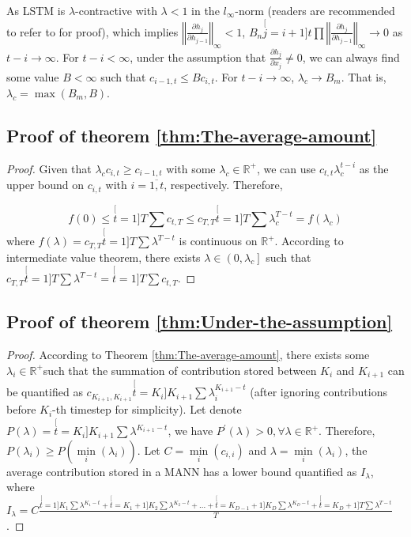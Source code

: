 As LSTM is $\lambda$-contractive with $\lambda<1$ in the $l_{\infty}$-norm
(readers are recommended to refer to \cite{miller2018recurrent} for
proof), which implies $\left\Vert \frac{\partial h_{j}}{\partial h_{j-1}}\right\Vert _{\infty}<1$,
$B_{n}\stackrel[j=i+1]{t}{\prod}\left\Vert \frac{\partial h_{j}}{\partial h_{j-1}}\right\Vert _{\infty}\rightarrow0$
as $t-i\rightarrow\infty$. For $t-i<\infty$, under the assumption
that $\frac{\partial h_{j}}{\partial x_{j}}\neq0$, we can always
find some value $B<\infty$ such that $c_{i-1,t}\leq Bc_{i,t}$. For
$t-i\rightarrow\infty$, $\lambda_{c}\rightarrow B_{m}$. That is,
$\lambda_{c}=\max\left(B_{m},B\right)$.

\subsection{Proof of theorem \ref{thm:The-average-amount}\label{subsec:Proof-of-theorem-1}}
\begin{proof}
Given that $\lambda_{c}c_{i,t}\geq c_{i-1,t}$ with some $\lambda_{c}\in\mathbb{R^{+}}$,
we can use $c_{t,t}\lambda_{c}^{t-i}$ as the upper bound on $c_{i,t}$
with $i=\overline{1,t}$, respectively. Therefore,

\[
f(0)\leq\stackrel[t=1]{T}{\sum}c_{t,T}\leq c_{T,T}\stackrel[t=1]{T}{\sum}\lambda_{c}^{T-t}=f\left(\lambda_{c}\right)
\]
where $f(\lambda)=c_{T,T}\stackrel[t=1]{T}{\sum}\lambda^{T-t}$ is
continuous on $\mathbb{R^{+}}$. According to intermediate value theorem,
there exists $\lambda\in\left(0,\lambda_{c}\right]$ such that $c_{T,T}\stackrel[t=1]{T}{\sum}\lambda^{T-t}=\stackrel[t=1]{T}{\sum}c_{t,T}$.
\end{proof}

\subsection{Proof of theorem \ref{thm:Under-the-assumption}\label{subsec:Proof-of-theorem-2}}
\begin{proof}
According to Theorem \ref{thm:The-average-amount}, there exists some
$\lambda_{i}\in\mathbb{R^{+}}$such that the summation of contribution
stored between $K_{i}$ and $K_{i+1}$ can be quantified as $c_{K_{i+1},K_{i+1}}\stackrel[t=K_{i}]{K_{i+1}}{\sum}\lambda_{i}^{K_{i+1}-t}$
(after ignoring contributions before $K_{i}$-th timestep for simplicity).
Let denote $P(\lambda)=\stackrel[t=K_{i}]{K_{i+1}}{\sum}\lambda^{K_{i+1}-t}$,
we have $P^{\prime}\left(\lambda\right)>0,\mathbb{\forall\lambda\in R^{+}}$.
Therefore, $P(\lambda_{i})\geq P\left(\underset{i}{\min}\left(\lambda_{i}\right)\right)$.
Let $C=\underset{i}{\min}\left(c_{i,i}\right)$ and $\lambda=\underset{i}{\min}\left(\lambda_{i}\right)$,
the average contribution stored in a MANN has a lower bound quantified
as $I_{\lambda}$, where $I_{\lambda}=C\frac{\stackrel[t=1]{K_{1}}{\sum}\lambda^{K_{1}-t}+\stackrel[t=K_{1}+1]{K_{2}}{\sum}\lambda^{K_{2}-t}+...+\stackrel[t=K_{D-1}+1]{K_{D}}{\sum}\lambda^{K_{D}-t}+\stackrel[t=K_{D}+1]{T}{\sum}\lambda^{T-t}}{T}$.
\end{proof}

